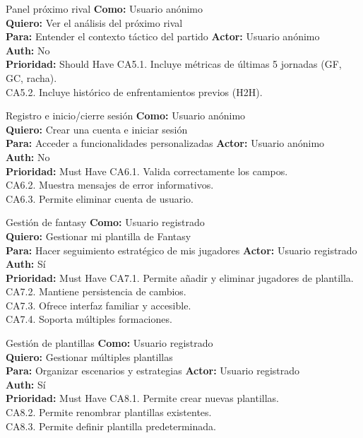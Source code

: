 {Panel próximo rival}
{\textbf{Como:} Usuario anónimo\\ \textbf{Quiero:} Ver el análisis del próximo rival\\ \textbf{Para:} Entender el contexto táctico del partido}
{\textbf{Actor:} Usuario anónimo\\ \textbf{Auth:} No\\ \textbf{Prioridad:} Should Have}
{CA5.1. Incluye métricas de últimas 5 jornadas (GF, GC, racha).\\ CA5.2. Incluye histórico de enfrentamientos previos (H2H).}

{Registro e inicio/cierre sesión}
{\textbf{Como:} Usuario anónimo\\ \textbf{Quiero:} Crear una cuenta e iniciar sesión\\ \textbf{Para:} Acceder a funcionalidades personalizadas}
{\textbf{Actor:} Usuario anónimo\\ \textbf{Auth:} No\\ \textbf{Prioridad:} Must Have}
{CA6.1. Valida correctamente los campos.\\ CA6.2. Muestra mensajes de error informativos.\\ CA6.3. Permite eliminar cuenta de usuario.}

{Gestión de fantasy}
{\textbf{Como:} Usuario registrado\\ \textbf{Quiero:} Gestionar mi plantilla de Fantasy\\ \textbf{Para:} Hacer seguimiento estratégico de mis jugadores}
{\textbf{Actor:} Usuario registrado\\ \textbf{Auth:} Sí\\ \textbf{Prioridad:} Must Have}
{CA7.1. Permite añadir y eliminar jugadores de plantilla.\\ CA7.2. Mantiene persistencia de cambios.\\ CA7.3. Ofrece interfaz familiar y accesible.\\ CA7.4. Soporta múltiples formaciones.}

{Gestión de plantillas}
{\textbf{Como:} Usuario registrado\\ \textbf{Quiero:} Gestionar múltiples plantillas\\ \textbf{Para:} Organizar escenarios y estrategias}
{\textbf{Actor:} Usuario registrado\\ \textbf{Auth:} Sí\\ \textbf{Prioridad:} Must Have}
{CA8.1. Permite crear nuevas plantillas.\\ CA8.2. Permite renombrar plantillas existentes.\\ CA8.3. Permite definir plantilla predeterminada.}

